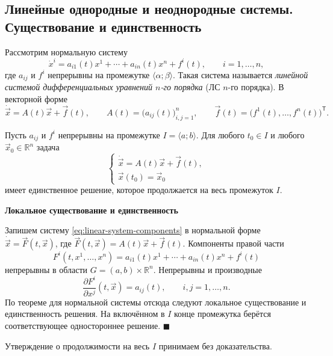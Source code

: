 \documentclass[12pt,a4paper]{article}
\numberwithin{equation}{section}
\newcommand{\R}{\mathbb{R}}
\newcommand{\vect}[1]{\vec{#1}}
\renewenvironment{proof}[1][Доказательство]{\begin{center}\textbf{#1}\end{center}}{\hfill$\blacksquare$\par}
\DeclareRobustCommand{\examtag}[1]{\space{\normalfont\small\color{HSEgray}(#1)}}
\begin{document}
\subsection[Линейные системы\examtag{вопрос~12}]{Линейные однородные и неоднородные системы. Существование и единственность\examtag{вопрос~12}}
\begin{definitionHSE}
Рассмотрим нормальную систему
\begin{equation}
 \dot{x}^i=a_{i1}(t)x^1+\cdots+a_{in}(t)x^n+f^i(t),
 \qquad i=1,\ldots,n,
 \label{eq:linear-system-components}
\end{equation}
где $a_{ij}$ и $f^i$ непрерывны на промежутке $\langle\alpha;\beta\rangle$.
Такая система называется \textit{линейной системой дифференциальных
уравнений $n$-го порядка} (ЛС $n$-го порядка). В векторной форме
\[
 \dot{\vect{x}}=A(t)\vect{x}+\vect{f}(t),\qquad A(t)=\bigl(a_{ij}(t)\bigr)_{i,j=1}^n,
 \qquad \vect{f}(t)=\bigl(f^1(t),\ldots,f^n(t)\bigr)^{\mathsf T}.
\]
\end{definitionHSE}

\begin{theoremHSE}
Пусть $a_{ij}$ и $f^i$ непрерывны на промежутке $I=\langle a;b\rangle$.
Для любого $t_0\in I$ и любого $\vect{x}_0\in\R^n$ задача
\[
\begin{cases}
\dot{\vect{x}}=A(t)\vect{x}+\vect{f}(t),\\
\vect{x}(t_0)=\vect{x}_0
\end{cases}
\]
имеет единственное решение, которое продолжается на весь промежуток $I$.
\end{theoremHSE}

\begin{proof}[Локальное существование и единственность]
Запишем систему \eqref{eq:linear-system-components} в нормальной форме
$\dot{\vect{x}}=\vect{F}(t,\vect{x})$, где $\vect{F}(t,\vect{x})=A(t)\vect{x}+\vect{f}(t)$. Компоненты правой части
\[
 F^i(t,x^1,\ldots,x^n)
 =a_{i1}(t)x^1+\cdots+a_{in}(t)x^n+f^i(t)
\]
непрерывны в области $G=(a,b)\times\R^n$. Непрерывны и производные
\[
 \frac{\partial F^i}{\partial x^j}(t,\vect{x})=a_{ij}(t),
 \qquad i,j=1,\ldots,n .
\]
По теореме для нормальной системы отсюда следуют локальное существование
и единственность решения. На включённом в $I$ конце промежутка
берётся соответствующее одностороннее решение.
\end{proof}
Утверждение о продолжимости на весь $I$ принимаем без доказательства.
\end{document}
